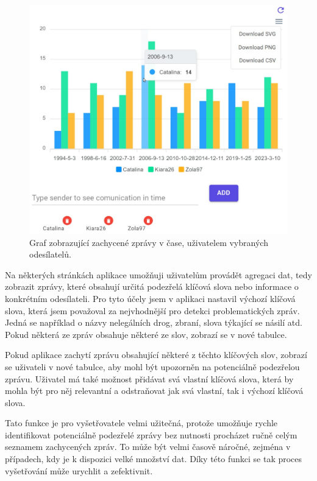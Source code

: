         \begin{figure}[H]
            \centering
            \includegraphics[scale=0.25]{obrazky-figures/Implementace/Blazor/chart.jpg}
            \caption{Graf zobrazující zachycené zprávy v čase, uživatelem vybraných odesílatelů.}
            \label{fig:tableFilterOperators}
        \end{figure}

        Na některých stránkách aplikace umožňuji uživatelům provádět agregaci dat, tedy zobrazit zprávy, které obsahují určitá podezřelá klíčová slova nebo informace o konkrétním odesílateli. Pro tyto účely jsem v aplikaci nastavil výchozí klíčová slova, která jsem považoval za nejvhodnější pro detekci problematických zpráv. Jedná se například o názvy nelegálních drog, zbraní, slova týkající se násilí atd. Pokud některá ze zpráv obsahuje některé ze slov, zobrazí se v nové tabulce. 
        
        Pokud aplikace zachytí zprávu obsahující některé z těchto klíčových slov, zobrazí se uživateli v nové tabulce, aby mohl být upozorněn na potenciálně podezřelou zprávu. Uživatel má také možnost přidávat svá vlastní klíčová slova, která by mohla být pro něj relevantní a odstraňovat jak svá vlastní, tak i výchozí klíčová slova. 
        
        Tato funkce je pro vyšetřovatele velmi užitečná, protože umožňuje rychle identifikovat potenciálně podezřelé zprávy bez nutnosti procházet ručně celým seznamem zachycených zpráv. To může být velmi časově náročné, zejména v případech, kdy je k dispozici velké množství dat. Díky této funkci se tak proces vyšetřování může urychlit a zefektivnit.


